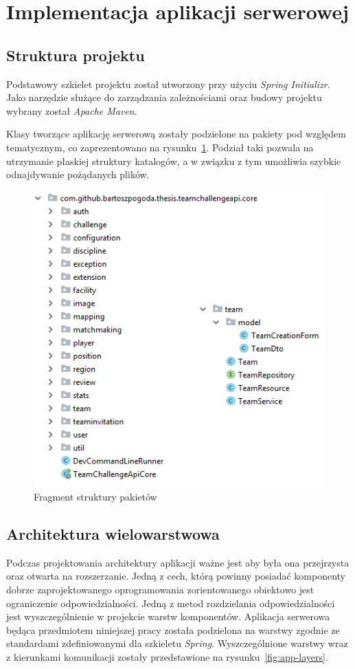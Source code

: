 \section{Implementacja aplikacji serwerowej}

\subsection{Struktura projektu}

Podstawowy szkielet projektu został utworzony przy użyciu \textit{Spring Initializr}. Jako narzędzie służące do zarządzania zależnościami oraz budowy projektu wybrany został \textit{Apache Maven}. 

  Klasy tworzące aplikację serwerową zostały podzielone na pakiety pod względem tematycznym, co zaprezentowano na rysunku~\ref{fig:packages}. Podział taki pozwala na utrzymanie płaskiej struktury katalogów, a w związku z tym umożliwia szybkie odnajdywanie pożądanych plików.
  
  
\begin{figure}[ht]
\centering
\includegraphics[width=0.5\linewidth]{06-implementacja/rys/package-team.PNG}
\caption{Fragment struktury pakietów}
\label{fig:packages}
\end{figure}

\subsection{Architektura wielowarstwowa}

Podczas projektowania architektury aplikacji ważne jest aby była ona przejrzysta oraz otwarta na rozszerzanie. Jedną z cech, którą powinny posiadać komponenty dobrze zaprojektowanego oprogramowania zorientowanego obiektowo jest ograniczenie odpowiedzialności. Jedną z metod rozdzielania odpowiedzialności jest wyszczególnienie w projekcie warstw komponentów. Aplikacja serwerowa będąca przedmiotem niniejszej pracy została podzielona na warstwy zgodnie ze standardami zdefiniowanymi dla szkieletu \textit{Spring}. Wyszczególnione warstwy wraz z kierunkami komunikacji zostały przedstawione na rysunku~\ref{fig:app-layers}.


